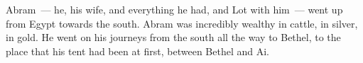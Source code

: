 
\begin{inparaenum}
     Abram~--- he, his wife, and everything he had, and Lot with him~--- went up from Egypt towards the south.%
     Abram was incredibly wealthy in cattle, in silver, in gold.%
     He went on his journeys from the south all the way to Bethel, to the place that his tent had been at first, between Bethel and Ai.%
\end{inparaenum}

